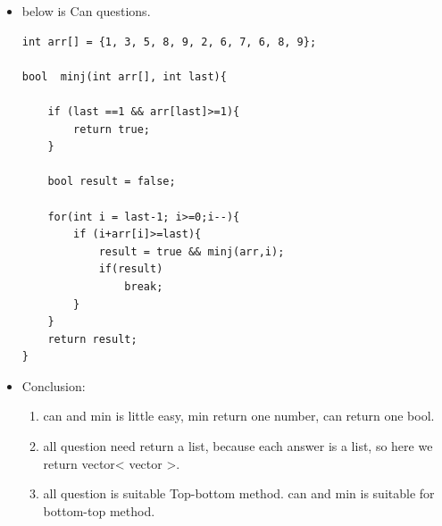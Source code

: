 \documentclass[a4paper,11pt,twoside]{book}
\begin{document}
\begin{itemize}
	\item below is Can questions.  
\begin{lstlisting}[numbers=none]
int arr[] = {1, 3, 5, 8, 9, 2, 6, 7, 6, 8, 9};

bool  minj(int arr[], int last){
	
	if (last ==1 && arr[last]>=1){
		return true;
	}
	
	bool result = false;
	
	for(int i = last-1; i>=0;i--){
		if (i+arr[i]>=last){
			result = true && minj(arr,i);
			if(result)
				break;
		}
	}
	return result;
}	
\end{lstlisting} 

	\item Conclusion:
\begin{enumerate}
	\item can and min is little easy, min return one number, can return one bool. 
	\item all question need return a list, because each answer is a list, so here we return vector< vector >. 
	\item all question is suitable Top-bottom method. can and min is suitable for bottom-top method.
\end{enumerate}
		
\end{itemize}
\end{document}
